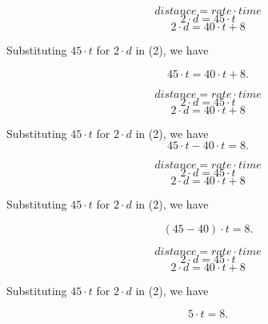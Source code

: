 \documentclass{beamer} %
\begin{document}
\setcounter{equation}{0}

\begin{frame}
  \[distance = rate \cdot time\]
  \begin{equation}
    2\cdot d = 45\cdot t
  \end{equation}
  \begin{equation}
    2\cdot d = 40\cdot t + 8
  \end{equation}

  \pause Substituting $45\cdot t$ for $2\cdot d$ in (2), we have \pause

  \[45\cdot t = 40\cdot t + 8.\]
\end{frame}

\setcounter{equation}{0}

\begin{frame}
  \[distance = rate \cdot time\]
  \begin{equation}
    2\cdot d = 45\cdot t
  \end{equation}
  \begin{equation}
    2\cdot d = 40\cdot t + 8
  \end{equation}

  Substituting $45\cdot t$ for $2\cdot d$ in (2), we have
  \[45\cdot t - 40\cdot t = 8.\]
\end{frame}

\setcounter{equation}{0}

\begin{frame}
  \[distance = rate \cdot time\]
  \begin{equation}
  2\cdot d = 45\cdot t
  \end{equation}
  \begin{equation}
  2\cdot d = 40\cdot t + 8
  \end{equation}

  Substituting $45\cdot t$ for $2\cdot d$ in (2), we have

  \[(45 - 40)\cdot t = 8.\]
\end{frame}

\setcounter{equation}{0}

\begin{frame}
\[
distance = rate \cdot time
\]
\begin{equation}
2\cdot d = 45\cdot t
\end{equation}
\begin{equation}
2\cdot d = 40\cdot t + 8
\end{equation}

Substituting $45\cdot t$ for $2\cdot d$ in (2), we have

\[
5\cdot t = 8.
\]
\end{frame}
\end{document}
